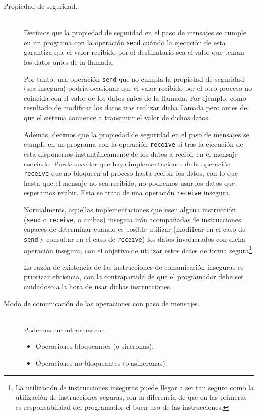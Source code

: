 \begin{description}
    \item [Propiedad de seguridad.]~\\
        Decimos que la propiedad de seguridad en el paso de mensajes se cumple en un programa con la operación \verb|send| cuándo la ejecución de esta garantiza que el valor recibido por el destinatario sea el valor que tenían los datos antes de la llamada.

        Por tanto, una operación \verb|send| que no cumpla la propiedad de seguridad (sea insegura) podría ocasionar que el valor recibido por el otro proceso no coincida con el valor de los datos antes de la llamada. Por ejemplo, como resultado de modificar los datos tras realizar dicha llamada pero antes de que el sistema comience a transmitir el valor de dichos datos.

        Además, decimos que la propiedad de seguridad en el paso de mensajes se cumple en un programa con la operación \verb|receive| si tras la ejecución de esta disponemos instantáneamente de los datos a recibir en el mensaje asociado. Puede suceder que haya implementaciones de la operación \verb|receive| que no bloqueen al proceso hasta recibir los datos, con lo que hasta que el mensaje no sea recibido, no podremos usar los datos que esperamos recibir. Esta se trata de una operación \verb|receive| insegura.

        Normalmente, aquellas implementaciones que usen alguna instrucción (\verb|send| o \verb|receive|, o ambas) insegura irán acompañadas de instrucciones capaces de determinar cuando es posible utilizar (modificar en el caso de \verb|send| y consultar en el caso de \verb|receive|) los datos involucrados con dicha operación insegura, con el objetivo de utilizar estos datos de forma segura\footnote{La utilización de instrucciones inseguras puede llegar a ser tan seguro como la utilización de instrucciones seguras, con la diferencia de que en las primeras es responsabilidad del programador el buen uso de las instrucciones.}.

        La razón de existencia de las instrucciones de comunicación inseguras es priorizar eficiencia, con la contrapartida de que el programador debe ser cuidadoso a la hora de usar dichas instrucciones.
    \item [Modo de comunicación de las operaciones con paso de mensajes.]~\\
        Podemos encontrarnos con:
        \begin{itemize}
            \item Operaciones bloqueantes (o síncronas).
            \item Operaciones no bloqueantes (o asíncronas).
        \end{itemize}
\end{description}

